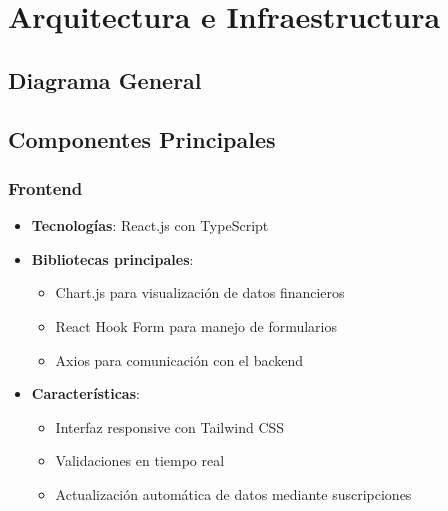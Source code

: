 \section{Arquitectura e Infraestructura}
\subsection{Diagrama General}

\subsection{Componentes Principales}
\subsubsection{Frontend}
\begin{itemize}
    \item \textbf{Tecnologías}: React.js con TypeScript
    \item \textbf{Bibliotecas principales}:
    \begin{itemize}
        \item Chart.js para visualización de datos financieros
        \item React Hook Form para manejo de formularios
        \item Axios para comunicación con el backend
    \end{itemize}
    \item \textbf{Características}:
    \begin{itemize}
        \item Interfaz responsive con Tailwind CSS
        \item Validaciones en tiempo real
        \item Actualización automática de datos mediante suscripciones
    \end{itemize}
\end{itemize}


